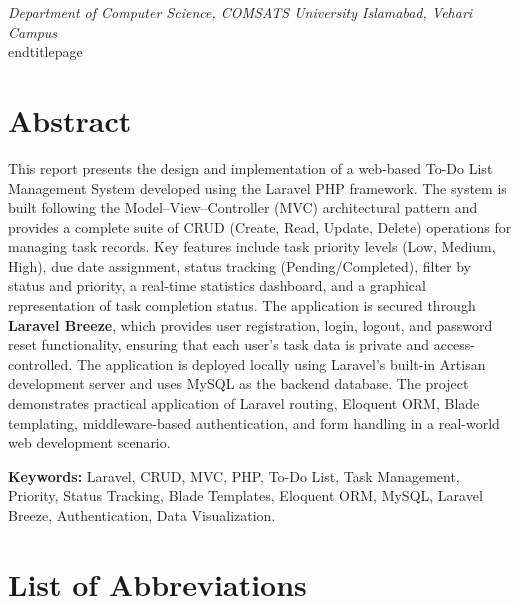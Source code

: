 \documentclass[12pt,a4paper]{report}
\begin{document}
\begin{titlepage}
\vfill
{\small\textit{Department of Computer Science, COMSATS University Islamabad, Vehari Campus}}
\\end{titlepage}


\chapter*{Abstract}

This report presents the design and implementation of a web-based To-Do List
Management System developed using the Laravel PHP framework. The system is built
following the Model--View--Controller (MVC) architectural pattern and provides a
complete suite of CRUD (Create, Read, Update, Delete) operations for managing task
records. Key features include task priority levels (Low, Medium, High), due date
assignment, status tracking (Pending/Completed), filter by status and priority, a
real-time statistics dashboard, and a graphical representation of task completion
status. The application is secured through \textbf{Laravel Breeze}, which provides
user registration, login, logout, and password reset functionality, ensuring that
each user's task data is private and access-controlled. The application is deployed
locally using Laravel's built-in Artisan development server and uses MySQL as the
backend database. The project demonstrates practical application of Laravel routing,
Eloquent ORM, Blade templating, middleware-based authentication, and form handling
in a real-world web development scenario.

\vspace{1cm}
\textbf{Keywords:} Laravel, CRUD, MVC, PHP, To-Do List, Task Management,
Priority, Status Tracking, Blade Templates, Eloquent ORM, MySQL, Laravel Breeze,
Authentication, Data Visualization.

\chapter*{List of Abbreviations}


\end{titlepage}
\end{document}
